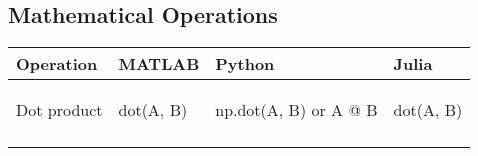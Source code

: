 \documentclass[10pt, landscape]{article}
\newenvironment{Shaded}{}{}
\newcommand{\OperatorTok}[1]{\textcolor[rgb]{0.40,0.40,0.40}{{#1}}}
\newcommand{\NormalTok}[1]{{#1}}
\begin{document}
\begin{multicols*}{2}
\section{Mathematical Operations}\label{mathematical-operations}

\begin{table}[ht]
\begin{tabular}[ ]{@{}llll@{}}
\toprule
\begin{minipage}[b]{0.23\columnwidth}\raggedright\strut
Operation\strut
\end{minipage} & \begin{minipage}[b]{0.22\columnwidth}\raggedright\strut
MATLAB\strut
\end{minipage} & \begin{minipage}[b]{0.23\columnwidth}\raggedright\strut
Python\strut
\end{minipage} & \begin{minipage}[b]{0.20\columnwidth}\raggedright\strut
Julia\strut
\end{minipage}\tabularnewline
\midrule
\begin{minipage}[t]{0.23\columnwidth}\raggedright\strut
Dot product\strut
\end{minipage} & \begin{minipage}[t]{0.22\columnwidth}\raggedright\strut
\begin{Shaded}
\begin{Highlighting}[]
\NormalTok{dot(A, B)}
\end{Highlighting}
\end{Shaded}
\strut
\end{minipage} & \begin{minipage}[t]{0.23\columnwidth}\raggedright\strut
\begin{Shaded}
\begin{Highlighting}[]
\NormalTok{np.dot(A, B) }\OperatorTok{or} \NormalTok{A @ B}
\end{Highlighting}
\end{Shaded}
\strut
\end{minipage} & \begin{minipage}[t]{0.20\columnwidth}\raggedright\strut
\begin{Shaded}
\begin{Highlighting}[]
\NormalTok{dot(A, B)}
\end{Highlighting}
\end{Shaded}
\strut
\end{minipage}\tabularnewline
\begin{minipage}[t]{0.23\columnwidth}\raggedright\strut

\end{minipage}
\end{tabular}
\end{table}
\end{multicols*}
\end{document}
